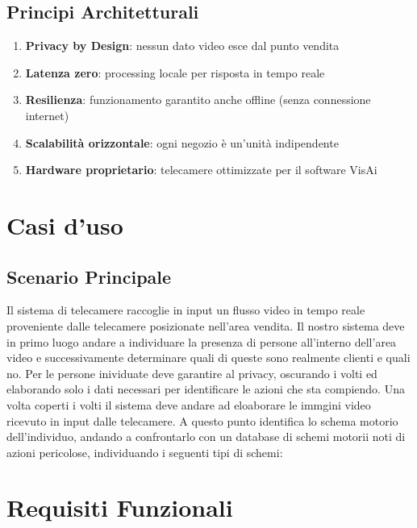 \documentclass[a4paper, 12pt]{article}
\begin{document}
\subsection{Principi Architetturali}

\begin{enumerate}
    \item \textbf{Privacy by Design}: nessun dato video esce dal punto vendita
    \item \textbf{Latenza zero}: processing locale per risposta in tempo reale
    \item \textbf{Resilienza}: funzionamento garantito anche offline (senza connessione internet)
    \item \textbf{Scalabilità orizzontale}: ogni negozio è un'unità indipendente
    \item \textbf{Hardware proprietario}: telecamere ottimizzate per il software VisAi
\end{enumerate}

\section{Casi d'uso}

\subsection{Scenario Principale}
Il sistema di telecamere raccoglie in input un flusso video in tempo reale proveniente dalle telecamere posizionate nell'area vendita.
Il nostro sistema deve in primo luogo andare a individuare la presenza di persone all'interno dell'area video e successivamente determinare quali di queste sono realmente clienti e quali no.
Per le persone inividuate deve garantire al privacy, oscurando i volti ed elaborando solo i dati necessari per identificare le azioni che sta compiendo.
Una volta coperti i volti il sistema deve andare ad eloaborare le immgini video ricevuto in input dalle telecamere. A questo punto identifica lo schema motorio dell'individuo, andando a confrontarlo con un database di schemi motorii noti di azioni pericolose, individuando i seguenti tipi di schemi:


\section{Requisiti Funzionali}
\end{document}
